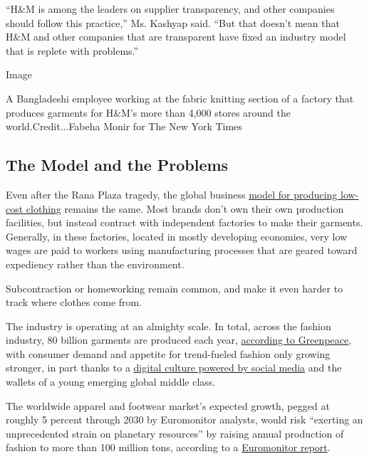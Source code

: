 ``H\&M is among the leaders on supplier transparency, and other
companies should follow this practice,'' Ms. Kashyap said. ``But that
doesn't mean that H\&M and other companies that are transparent have
fixed an industry model that is replete with problems.''

Image

A Bangladeshi employee working at the fabric knitting section of a
factory that produces garments for H\&M's more than 4,000 stores around
the world.Credit...Fabeha Monir for The New York Times

\hypertarget{the-model-and-the-problems}{%
\subsection{The Model and the
Problems}\label{the-model-and-the-problems}}

Even after the Rana Plaza tragedy, the global business
\href{https://www.nytimes3xbfgragh.onion/2018/04/24/style/survivors-of-rana-plaza-disaster.html}{model
for producing low-cost clothing} remains the same. Most brands don't own
their own production facilities, but instead contract with independent
factories to make their garments. Generally, in these factories, located
in mostly developing economies, very low wages are paid to workers using
manufacturing processes that are geared toward expediency rather than
the environment.

Subcontraction or homeworking remain common, and make it even harder to
track where clothes come from.

The industry is operating at an almighty scale. In total, across the
fashion industry, 80 billion garments are produced each year,
\href{https://www.greenpeace.org/international/story/7539/fast-fashion-is-drowning-the-world-we-need-a-fashion-revolution/}{according
to Greenpeace}, with consumer demand and appetite for trend-fueled
fashion only growing stronger, in part thanks to a
\href{https://www.nytimes3xbfgragh.onion/2014/04/10/fashion/fashion-in-the-age-of-instagram.html}{digital
culture powered by social media} and the wallets of a young emerging
global middle class.

The worldwide apparel and footwear market's expected growth, pegged at
roughly 5 percent through 2030 by Euromonitor analysts, would risk
``exerting an unprecedented strain on planetary resources'' by raising
annual production of fashion to more than 100 million tons, according to
a
\href{https://fashinnovation.com/fashions-sustainability-push-isnt-keeping-up-with-growth/}{Euromonitor
report}.

